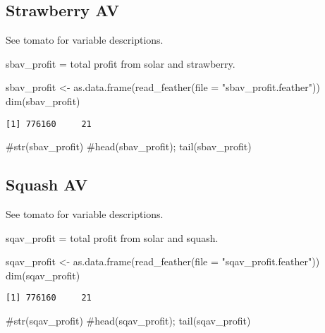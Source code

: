 \documentclass[
  letterpaper,
  DIV=11,
  numbers=noendperiod]{scrartcl}
\newenvironment{Shaded}{\begin{snugshade}}{\end{snugshade}}
\newcommand{\AttributeTok}[1]{\textcolor[rgb]{0.40,0.45,0.13}{#1}}
\newcommand{\CommentTok}[1]{\textcolor[rgb]{0.37,0.37,0.37}{#1}}
\newcommand{\FunctionTok}[1]{\textcolor[rgb]{0.28,0.35,0.67}{#1}}
\newcommand{\NormalTok}[1]{\textcolor[rgb]{0.00,0.23,0.31}{#1}}
\newcommand{\OtherTok}[1]{\textcolor[rgb]{0.00,0.23,0.31}{#1}}
\newcommand{\StringTok}[1]{\textcolor[rgb]{0.13,0.47,0.30}{#1}}
\begin{document}
\subsection{Strawberry AV}\label{strawberry-av}

See tomato for variable descriptions.

sbav\_profit = total profit from solar and strawberry.

\begin{Shaded}
\begin{Highlighting}[]
\NormalTok{sbav\_profit }\OtherTok{\textless{}{-}} \FunctionTok{as.data.frame}\NormalTok{(}\FunctionTok{read\_feather}\NormalTok{(}\AttributeTok{file =} \StringTok{"sbav\_profit.feather"}\NormalTok{))}
\FunctionTok{dim}\NormalTok{(sbav\_profit)}
\end{Highlighting}
\end{Shaded}

\begin{verbatim}
[1] 776160     21
\end{verbatim}

\begin{Shaded}
\begin{Highlighting}[]
\CommentTok{\#str(sbav\_profit)}
\CommentTok{\#head(sbav\_profit); tail(sbav\_profit)}
\end{Highlighting}
\end{Shaded}

\subsection{Squash AV}\label{squash-av}

See tomato for variable descriptions.

sqav\_profit = total profit from solar and squash.

\begin{Shaded}
\begin{Highlighting}[]
\NormalTok{sqav\_profit }\OtherTok{\textless{}{-}} \FunctionTok{as.data.frame}\NormalTok{(}\FunctionTok{read\_feather}\NormalTok{(}\AttributeTok{file =} \StringTok{"sqav\_profit.feather"}\NormalTok{))}
\FunctionTok{dim}\NormalTok{(sqav\_profit)}
\end{Highlighting}
\end{Shaded}

\begin{verbatim}
[1] 776160     21
\end{verbatim}

\begin{Shaded}
\begin{Highlighting}[]
\CommentTok{\#str(sqav\_profit)}
\CommentTok{\#head(sqav\_profit); tail(sqav\_profit)}
\end{Highlighting}
\end{Shaded}
\end{document}
